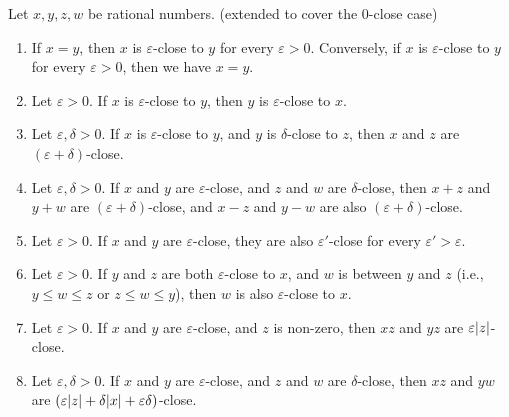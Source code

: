 \setcounter{theorem}{6}
\begin{proposition}\label{4.3.7}
    Let \(x, y, z, w\) be rational numbers.
    (extended to cover the \(0\)-close case)
    \begin{enumerate}
        \item If \(x = y\), then \(x\) is \(\varepsilon\)-close to \(y\) for every \(\varepsilon > 0\).
              Conversely, if \(x\) is \(\varepsilon\)-close to \(y\) for every \(\varepsilon > 0\), then we have \(x = y\).
        \item Let \(\varepsilon > 0\).
              If \(x\) is \(\varepsilon\)-close to \(y\), then \(y\) is \(\varepsilon\)-close to \(x\).
        \item Let \(\varepsilon, \delta > 0\).
              If \(x\) is \(\varepsilon\)-close to \(y\), and \(y\) is \(\delta\)-close to \(z\), then \(x\) and \(z\) are \((\varepsilon + \delta)\)-close.
        \item Let \(\varepsilon, \delta > 0\).
              If \(x\) and \(y\) are \(\varepsilon\)-close, and \(z\) and \(w\) are \(\delta\)-close, then \(x + z\) and \(y + w\) are \((\varepsilon + \delta)\)-close, and \(x - z\) and \(y - w\) are also \((\varepsilon + \delta)\)-close.
        \item Let \(\varepsilon > 0\).
              If \(x\) and \(y\) are \(\varepsilon\)-close, they are also \(\varepsilon'\)-close for every \(\varepsilon' > \varepsilon\).
        \item Let \(\varepsilon > 0\).
              If \(y\) and \(z\) are both \(\varepsilon\)-close to \(x\), and \(w\) is between \(y\) and \(z\) (i.e., \(y \leq w \leq z\) or \(z \leq w \leq y\)), then \(w\) is also \(\varepsilon\)-close to \(x\).
        \item Let \(\varepsilon > 0\).
              If \(x\) and \(y\) are \(\varepsilon\)-close, and \(z\) is non-zero, then \(xz\) and \(yz\) are \(\varepsilon\abs*{z}\)-close.
        \item Let \(\varepsilon, \delta > 0\).
              If \(x\) and \(y\) are \(\varepsilon\)-close, and \(z\) and \(w\) are \(\delta\)-close, then \(xz\) and \(yw\) are \((\varepsilon\abs*{z} + \delta\abs*{x} + \varepsilon\delta)\)-close.
    \end{enumerate}
\end{proposition}


